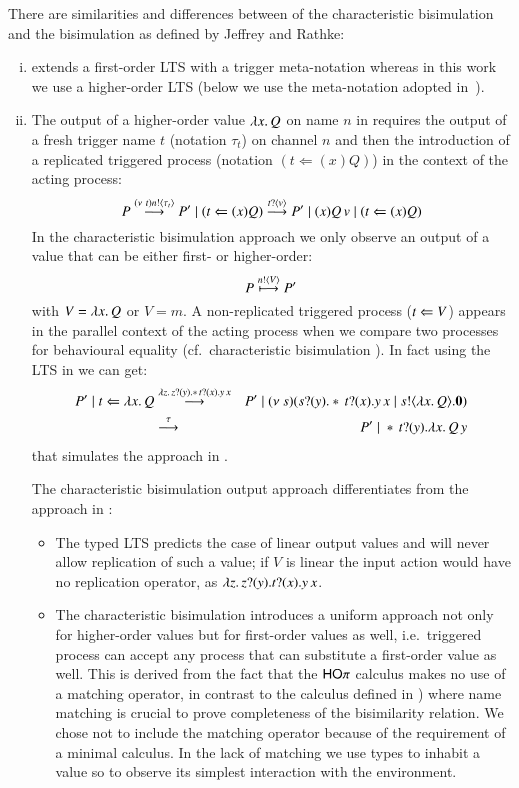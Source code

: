 There are similarities and differences between of the characteristic bisimulation
and the bisimulation as defined by Jeffrey and Rathke:
%
\begin{enumerate}[i)]
	\item	\cite{JeffreyR05} extends a first-order
		LTS with a trigger meta-notation whereas in this
		work we use a higher-order LTS
		(below we use the meta-notation adopted in~\cite{JeffreyR05}).

	\item	The output of a higher-order value $\lambda x.\,Q$ on name
		$n$ in \cite{JeffreyR05}
		requires the output of
		a fresh trigger name $t$ (notation $\tau_t$)
		on channel $n$ 
		and then the introduction of a replicated triggered process
		(notation $(t \Leftarrow (x) Q)$)
		in the context of the acting process:
		\[
			P \stackrel{(\nu\ t) n ! \langle \tau_{t} \rangle}{\longrightarrow} P' \;|\; (t \Leftarrow (x) Q) \stackrel{t ? \langle v \rangle}{\longrightarrow} P' \;|\; (x) Q\,v \;|\; (t \Leftarrow (x) Q) 
		\]
		In the characteristic bisimulation approach we only observe
		an output of a value that can be either first- or higher-order:
		\[
			P \stackrel{n ! \langle V \rangle}{\longmapsto} P' 
		\]
		with $V = \lambda x.\,Q$ or $V = m$.
		A non-replicated triggered process ($t \Leftarrow V$)
		appears in
		the parallel context of the acting process when
		we compare two processes for behavioural equality
		(cf.~characteristic bisimulation ).
		In fact using the LTS in
		 we can get:
		\begin{eqnarray*}
			P' \;|\; t \Leftarrow \lambda x.\,Q
			&\stackrel{\lambda z.\,z ? (y) . \ast\,{} t ? (x) . y\,x}{\longrightarrow}&
			P' \;|\; (\nu\ s)(s ? (y) . \ast\,{} t ? (x) . y\,x \;|\; s ! \langle \lambda x.\,Q \rangle . \mathbf{0})\\
			&\stackrel{\tau}{\longrightarrow}&
			P' \;|\; \ast\,{}t ? (y) . \lambda x.\,Q\,y
		\end{eqnarray*}
		that simulates the approach in \cite{JeffreyR05}.

		The characteristic bisimulation output approach differentiates from
		the approach in \cite{JeffreyR05}:
		\begin{itemize}
			\item	The typed LTS predicts the case of linear
				output values and will never allow replication
				of such a value;
				if $V$ is linear the input action would have no replication
				operator, as
				$\lambda z.\,z ? (y) . t ? (x) . y\,x$.

			\item	The characteristic bisimulation introduces a uniform approach
				not only for
				higher-order values but for first-order values
				as well, i.e.~triggered process can accept any
				process that can substitute a first-order value as well.
				This is derived from the fact that the $\mathsf{HO}\pi$
				calculus makes no use of a matching operator, in contrast
				to the calculus defined in \cite{JeffreyR05})
				where name matching is crucial to prove completeness
				of the bisimilarity relation.
				We chose not to include the matching operator
				because of the requirement of a minimal calculus.
				In the lack of matching we use types to inhabit
				a value so to observe its simplest interaction
				with the environment.


\end{itemize}
\end{enumerate}
